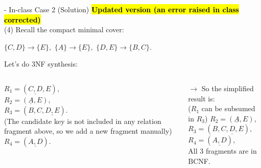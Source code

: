 \begin{frame}[fragile]{ - In-class Case 2 (Solution)}
	\textcolor{red}{\textbf{\hl{Updated version (an error raised in class corrected)}}}\\
	(4) Recall the compact minimal cover:\\\vspace{5pt}
	
	$\{C,D\} \rightarrow \{E\},$
	$\{A\}  \rightarrow \{E\},$
	$\{D,E\} \rightarrow \{B,C\}.$\\\vspace{5pt}
	
	Let's do 3NF synthesis:\\ \vspace{5pt}
	\begin{columns}
	$R_1 = (\underline{C, D}, E),$\\
	$R_2 = (\underline{A}, E),$\\
	$R_3 = (B, C, \underline{D, E}).$\\\vspace{3pt}
	(The candidate key is not included in any relation fragment above, so we add a new fragment manually)\\\vspace{3pt}
	$R_4 = (\underline{A, D}).$\\\vspace{3pt}
	
	 $\rightarrow$
	So the simplified result is:\\
	($R_1$ can be subsumed in $R_3$)
	$R_2 = (\underline{A}, E),$\\
	$R_3 = (B, \underline{C,D,E}),$\\
	$R_4 = (\underline{A, D}),$\\
	All 3 fragments are in BCNF.
	
	\end{columns}

\end{frame}

